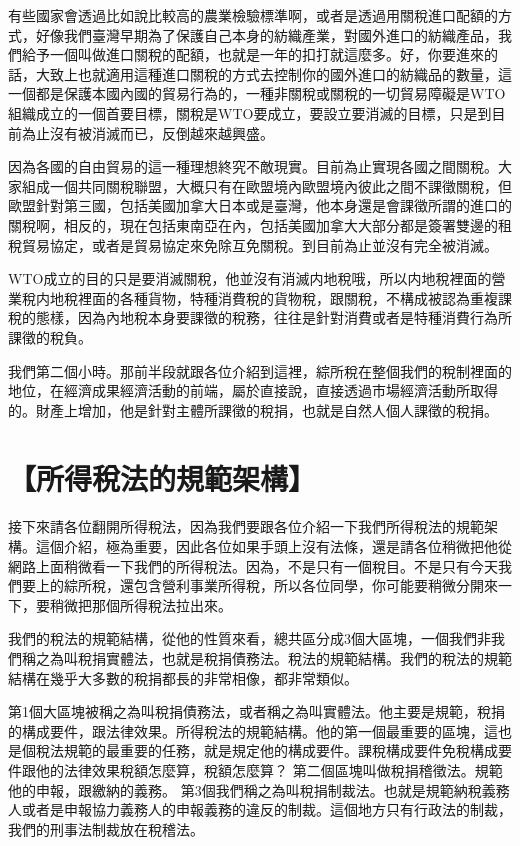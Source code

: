 \documentclass[oneside,sub3section]{ctexbook}
\begin{document}
有些國家會透過比如說比較高的農業檢驗標準啊，或者是透過用關稅進口配額的方式，好像我們臺灣早期為了保護自己本身的紡織產業，對國外進口的紡織產品，我們給予一個叫做進口關稅的配額，也就是一年的扣打就這麼多。好，你要進來的話，大致上也就適用這種進口關稅的方式去控制你的國外進口的紡織品的數量，這一個都是保護本國內國的貿易行為的，一種非關稅或關稅的一切貿易障礙是WTO組織成立的一個首要目標，關稅是WTO要成立，要設立要消滅的目標，只是到目前為止沒有被消滅而已，反倒越來越興盛。

因為各國的自由貿易的這一種理想終究不敵現實。目前為止實現各國之間關稅。大家組成一個共同關稅聯盟，大概只有在歐盟境內歐盟境內彼此之間不課徵關稅，但歐盟針對第三國，包括美國加拿大日本或是臺灣，他本身還是會課徵所謂的進口的關稅啊，相反的，現在包括東南亞在內，包括美國加拿大大部分都是簽署雙邊的租稅貿易協定，或者是貿易協定來免除互免關稅。到目前為止並沒有完全被消滅。

WTO成立的目的只是要消滅關稅，他並沒有消滅内地稅哦，所以内地稅裡面的營業稅内地稅裡面的各種貨物，特種消費稅的貨物稅，跟關稅，不構成被認為重複課稅的態樣，因為內地稅本身要課徵的稅務，往往是針對消費或者是特種消費行為所課徵的稅負。

我們第二個小時。那前半段就跟各位介紹到這裡，綜所稅在整個我們的稅制裡面的地位，在經濟成果經濟活動的前端，屬於直接說，直接透過市場經濟活動所取得的。財產上增加，他是針對主體所課徵的稅捐，也就是自然人個人課徵的稅捐。

\hypertarget{ux6240ux5f97ux7a05ux6cd5ux7684ux898fux7bc4ux67b6ux69cb}{%
\section{【所得稅法的規範架構】}\label{ux6240ux5f97ux7a05ux6cd5ux7684ux898fux7bc4ux67b6ux69cb}}

接下來請各位翻開所得稅法，因為我們要跟各位介紹一下我們所得稅法的規範架構。這個介紹，極為重要，因此各位如果手頭上沒有法條，還是請各位稍微把他從網路上面稍微看一下我們的所得稅法。因為，不是只有一個稅目。不是只有今天我們要上的綜所稅，還包含營利事業所得稅，所以各位同學，你可能要稍微分開來一下，要稍微把那個所得稅法拉出來。

我們的稅法的規範結構，從他的性質來看，總共區分成3個大區塊，一個我們非我們稱之為叫稅捐實體法，也就是稅捐債務法。稅法的規範結構。我們的稅法的規範結構在幾乎大多數的稅捐都長的非常相像，都非常類似。

第1個大區塊被稱之為叫稅捐債務法，或者稱之為叫實體法。他主要是規範，稅捐的構成要件，跟法律效果。所得稅法的規範結構。他的第一個最重要的區塊，這也是個稅法規範的最重要的任務，就是規定他的構成要件。課稅構成要件免稅構成要件跟他的法律效果稅額怎麼算，稅額怎麼算？
第二個區塊叫做稅捐稽徵法。規範他的申報，跟繳納的義務。
第3個我們稱之為叫稅捐制裁法。也就是規範納稅義務人或者是申報協力義務人的申報義務的違反的制裁。這個地方只有行政法的制裁，我們的刑事法制裁放在稅稽法。
\end{document}
